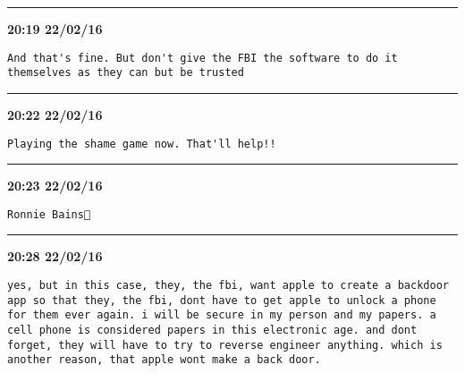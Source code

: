 \hrule%

\begin{adjustwidth}{0cm}{0cm}
\footnotesize \textbf{20:19 22/02/16}

\begin{lstlisting}[breaklines, breakatwhitespace, basicstyle=\small, frame=leftline]
And that's fine. But don't give the FBI the software to do it themselves as they can but be trusted
\end{lstlisting}
\end{adjustwidth}

\hrule%

\begin{adjustwidth}{0cm}{0cm}
\footnotesize \textbf{20:22 22/02/16}

\begin{lstlisting}[breaklines, breakatwhitespace, basicstyle=\small, frame=leftline]
Playing the shame game now. That'll help!!
\end{lstlisting}
\end{adjustwidth}

\hrule%

\begin{adjustwidth}{0cm}{0cm}
\footnotesize \textbf{20:23 22/02/16}

\begin{lstlisting}[breaklines, breakatwhitespace, basicstyle=\small, frame=leftline]
Ronnie Bains👀
\end{lstlisting}
\end{adjustwidth}

\hrule%

\begin{adjustwidth}{0cm}{0cm}
\footnotesize \textbf{20:28 22/02/16}

\begin{lstlisting}[breaklines, breakatwhitespace, basicstyle=\small, frame=leftline]
yes, but in this case, they, the fbi, want apple to create a backdoor app so that they, the fbi, dont have to get apple to unlock a phone for them ever again. i will be secure in my person and my papers. a cell phone is considered papers in this electronic age. and dont forget, they will have to try to reverse engineer anything. which is another reason, that apple wont make a back door.
\end{lstlisting}
\end{adjustwidth}

